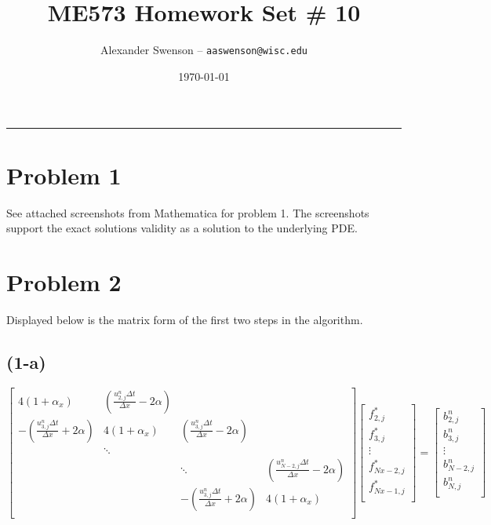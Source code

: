 \documentclass[12pt]{article}
\title{ME573 Homework Set \# 10}
\author{Alexander Swenson -- \texttt{aaswenson@wisc.edu}}
\date{\today}
\begin{document}
	
	\maketitle
	
	\vspace{-0.3in}
	\noindent
	\rule{\linewidth}{0.4pt}
	
	\noindent
	

\section{Problem 1}
	See attached screenshots from Mathematica for problem 1. The screenshots support the exact solutions validity as a solution to the underlying PDE.

\section{Problem 2}
	
\noindent Displayed below is the matrix form of the first two steps in the algorithm.
\subsection{(1-a)}	
\[
\begin{bmatrix} 
4(1+\alpha_x) & (\frac{u_{2,j}^n\Delta t}{\Delta x} - 2\alpha)   &			   &\\
-(\frac{u_{3,j}^n\Delta t}{\Delta x} + 2\alpha) & 4(1+\alpha_x) & (\frac{u_{3,j}^n\Delta t}{\Delta x} - 2\alpha)  &\\
& \ddots &			   &\\
&	 	  & \ddots & (\frac{u_{N-2,j}^n\Delta t}{\Delta x} - 2\alpha)  \\
&		  & -(\frac{u_{3,j}^n\Delta t}{\Delta x} + 2\alpha) & 4(1+\alpha_x)  \\ 
\end{bmatrix}
\begin{bmatrix} 
f_{2,j}^{*}\\
f_{3,j}^{*}\\
\vdots\\
f_{Nx-2,j}^{*}\\
f_{Nx-1,j}^{*}\\ 
\end{bmatrix} = 
\begin{bmatrix} 
b_{2,j}^n\\
b_{3,j}^n\\
\vdots\\
b_{N-2,j}^n\\
b_{N,j}^n\\ 
\end{bmatrix}
\]
\end{document}

